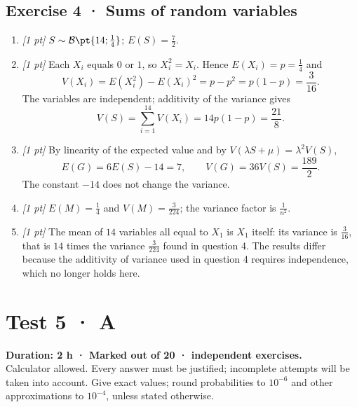 \subsection*{Exercise 4 · Sums of random variables}\begin{enumerate}

\item \textit{[1 pt]} $S\sim\mathcal B\pt{14;\frac{1}{4}}$; $E(S)=\frac{7}{2}$.

\item \textit{[1 pt]} Each $X_i$ equals $0$ or $1$, so $X_i^2=X_i$. Hence $E(X_i)=p=\frac{1}{4}$ and
\[V(X_i)=E(X_i^2)-E(X_i)^2=p-p^2=p(1-p)=\frac{3}{16}.\]
The variables are independent; additivity of the variance gives
\[V(S)=\sum_{i=1}^{14}V(X_i)=14p(1-p)=\frac{21}{8}.\]

\item \textit{[1 pt]} By linearity of the expected value and by $V(\lambda S+\mu)=\lambda^2V(S)$,
\[E(G)=6E(S)-14=7,\qquad V(G)=36V(S)=\frac{189}{2}.\]
The constant $-14$ does not change the variance.

\item \textit{[1 pt]} $E(M)=\frac{1}{4}$ and $V(M)=\frac{3}{224}$; the variance factor is $\frac{1}{n^2}$.

\item \textit{[1 pt]} The mean of $14$ variables all equal to $X_1$ is $X_1$ itself: its variance is $\frac{3}{16}$, that is $14$ times the variance $\frac{3}{224}$ found in question 4. The results differ because the additivity of variance used in question 4 requires independence, which no longer holds here.

\end{enumerate}

\fi

\ifmxteacher

\mxnewpage{}\label{sujet:7-3}

\section*{Test 5 · A}


\textbf{Duration: 2 h · Marked out of 20 ·  independent exercises.}\\Calculator allowed. Every answer must be justified; incomplete attempts will be taken into account. Give exact values; round probabilities to $10^{-6}$ and other approximations to $10^{-4}$, unless stated otherwise.

